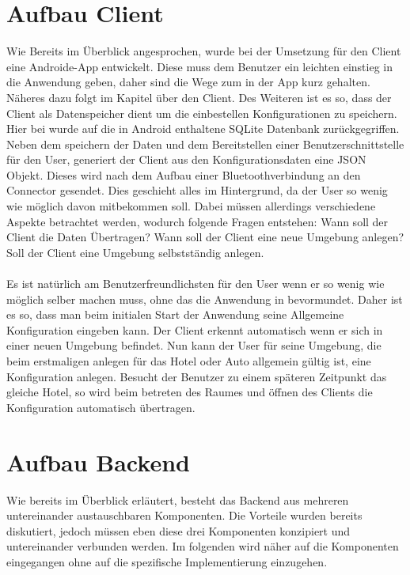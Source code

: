\section{Aufbau Client}

Wie Bereits im Überblick angesprochen, wurde bei der Umsetzung für den Client eine Androide-App entwickelt. Diese muss dem Benutzer ein leichten einstieg in die Anwendung geben, daher sind die Wege zum in der App kurz gehalten. Näheres dazu folgt im Kapitel über den Client. 
Des Weiteren ist es so, dass der Client als Datenspeicher dient um die einbestellen Konfigurationen zu speichern. Hier bei wurde auf die in Android enthaltene SQLite Datenbank zurückgegriffen. 
Neben dem speichern der Daten und dem Bereitstellen einer Benutzerschnittstelle für den User, generiert der Client aus den Konfigurationsdaten eine JSON Objekt. Dieses wird nach dem Aufbau einer Bluetoothverbindung an den Connector gesendet. 
Dies geschieht alles im Hintergrund, da der User so wenig wie möglich davon mitbekommen soll. Dabei müssen allerdings verschiedene Aspekte betrachtet werden, wodurch folgende Fragen entstehen: Wann soll der Client die Daten Übertragen? Wann soll der Client eine neue Umgebung anlegen? Soll der Client eine Umgebung selbstständig anlegen. 
\\\\
Es ist natürlich am Benutzerfreundlichsten für den User wenn er so wenig wie möglich selber machen muss, ohne das die Anwendung in bevormundet. 
Daher ist es so, dass man beim initialen Start der Anwendung seine Allgemeine Konfiguration eingeben kann. 
Der Client erkennt automatisch wenn er sich in einer neuen Umgebung befindet. Nun kann der User für seine Umgebung, die beim erstmaligen anlegen für das Hotel oder Auto allgemein gültig ist, eine Konfiguration anlegen. 
Besucht der Benutzer zu einem späteren Zeitpunkt das gleiche Hotel, so wird beim betreten des Raumes und öffnen des Clients
die Konfiguration automatisch übertragen. 

\section{Aufbau Backend}
Wie bereits im Überblick erläutert, besteht das Backend aus mehreren untereinander austauschbaren Komponenten. Die Vorteile wurden bereits diskutiert, jedoch müssen eben diese drei Komponenten konzipiert und untereinander verbunden werden.
Im folgenden wird näher auf die Komponenten eingegangen ohne auf die spezifische Implementierung einzugehen.

